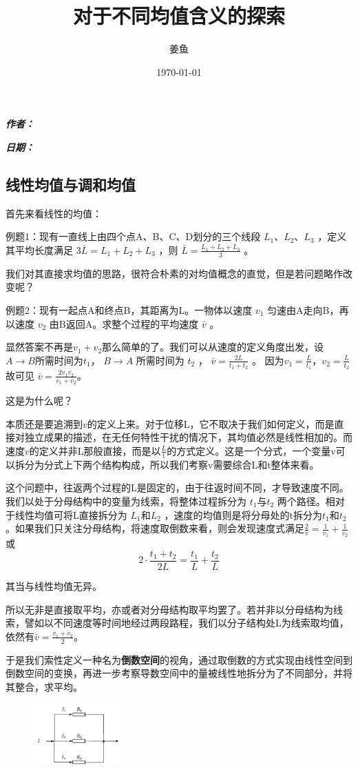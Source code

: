 \documentclass[fontset=none]{ctexart}
\makeatletter
\renewcommand{\maketitle}{
  \begin{flushleft} %
    {\huge\bfseries \@title \par} %
    \vspace{0.5em}
    {\large \bfseries \textit{作者：} \@author \par} %
    \vspace{0.5em}
    {\large\bfseries \textit{日期：}\@date}%
  \end{flushleft}
  \thispagestyle{empty} %
  \vspace{1cm} %
}
\makeatother
\begin{document}
\title{对于不同均值含义的探索}
\author{姜鱼}
\date{\today}
\maketitle
\kaishu

\subsection{线性均值与调和均值}

首先来看线性的均值：

\lishu
例题1：现有一直线上由四个点A、B、C、D划分的三个线段 $L_1$、$L_2$、$L_3$ ，定义其平均长度满足 $ 3 \bar{L} = L_1 + L_2 + L_3$ ，则 $\bar{L} = \frac{L_1 + L_2 + L_3}{3}$ 。

\kaishu
我们对其直接求均值的思路，很符合朴素的对均值概念的直觉，但是若问题略作改变呢？

\lishu
例题2：现有一起点A和终点B，其距离为L。一物体以速度 $v_1$ 匀速由A走向B，再以速度 $v_2$ 由B返回A。求整个过程的平均速度 $\bar{v}$ 。

显然答案不再是$v_1+v_2$那么简单的了。我们可以从速度的定义角度出发，设$A\to B$所需时间为$t_1$， $B\to A$ 所需时间为 $t_2$ ， $\bar{v}=\frac{2L}{t_1 + t_2}$ 。 因为$v_1 = \frac{L}{t_1}$，$v_2 = \frac{L}{t_2}$故可见 $\bar{v} = \frac{2v_1v_2}{v_1+v_2}$。

\kaishu
这是为什么呢？

本质还是要追溯到$v$的定义上来。对于位移L，它不取决于我们如何定义，而是直接对独立成果的描述，在无任何特性干扰的情况下，其均值必然是线性相加的。而速度$v$的定义并非L那般直接，而是以$\frac{L}{t}$的方式定义。这是一个分式，一个变量v可以拆分为分式上下两个结构构成，所以我们考察v需要综合L和t整体来看。

这个问题中，往返两个过程的L是固定的，由于往返时间不同，才导致速度不同。我们以处于分母结构中的变量为线索，将整体过程拆分为 $t_1\text{与}t_2$ 两个路径。相对于线性均值可将L直接拆分为 $L_1\text{和}L_2$ ，速度的均值则是将分母处的t拆分为$t_1\text{和}t_2$。如果我们只关注分母结构，将速度取倒数来看，则会发现速度式满足$\frac{2}{\bar{v}} = \frac{1}{v_1}+\frac{1}{v_2}$或$$2\cdot\frac{t_1+t_2}{2L} = \frac{t_1}{L} + \frac{t_2}{L}$$

其当与线性均值无异。

所以无非是直接取平均，亦或者对分母结构取平均罢了。若并非以分母结构为线索，譬如以不同速度等时间地经过两段路程，我们以分子结构处L为线索取均值，依然有$\bar{v}=\frac{v_1 + v_2}{2}$。

于是我们索性定义一种名为\textbf{倒数空间}的视角，通过取倒数的方式实现由线性空间到倒数空间的变换，再进一步考察导数空间中的量被线性地拆分为了不同部分，并将其整合，求平均。
\begin{figure} %
  \centering
  \includegraphics[width=0.3\textwidth]{2025-03-22_152403.png} %
  \label{1}
\end{figure}
\end{document}
